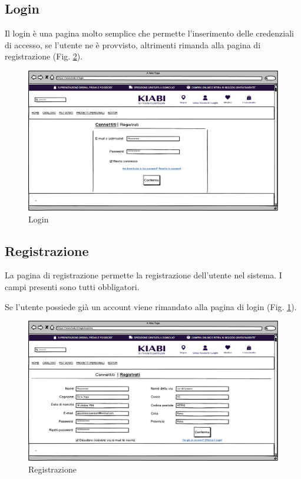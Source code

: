 \documentclass[12pt,italian,]{report}
\begin{document}
\subsection{Login} 

Il login è una pagina molto semplice che permette l'inserimento delle credenziali di accesso, se l'utente ne è provvisto, altrimenti rimanda alla pagina di registrazione (Fig. \ref{registrazione}).

\begin{figure}[h]
\centering
\includegraphics{../../balsamiq/balsamiq_finale/Login.png}
\caption{Login}
\label{login}
\end{figure}


\subsection{Registrazione} 

La pagina di registrazione permette la registrazione dell'utente nel sistema. I campi presenti sono tutti obbligatori.

Se l'utente possiede già un account viene rimandato alla pagina di login (Fig. \ref{login}).

\begin{figure}[h]
\centering
\includegraphics{../../balsamiq/balsamiq_finale/Registrazione.png}
\caption{Registrazione}
\label{registrazione}
\end{figure}
\clearpage 
\end{document}
